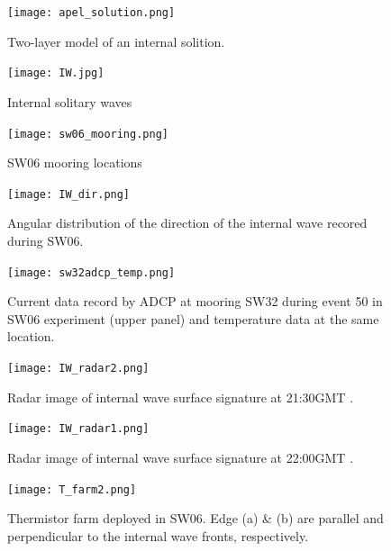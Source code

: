 
\begin{figure}[h]
\centering
  \texttt{[image: apel\_solution.png]}\\
  \caption{Two-layer model of an internal solition.}
  \label{fig:moorings}
\end{figure}



\begin{figure}[h]
\centering
  \texttt{[image: IW.jpg]}\\
  \caption{Internal solitary waves}
  \label{fig:moorings}
\end{figure}




\begin{figure}[h]
\centering
  \texttt{[image: sw06\_mooring.png]}\\
  \caption{SW06 mooring locations}
  \label{fig:moorings}
 \end{figure}


\begin{figure}[h]
\centering
  \texttt{[image: IW\_dir.png]}\\
  \caption{Angular distribution of the direction of the internal wave recored during SW06. }
  \label{fig:IW_dir}
\end{figure}


\begin{figure}[h]
\centering
  \texttt{[image: sw32adcp\_temp.png]}\\
  \caption{Current data record by ADCP at mooring SW32 during event 50 in SW06 experiment (upper panel) and  temperature data at the same location. }
  \label{fig: sw32adcp_temp}
\end{figure}


\begin{figure}[h]
\centering
  \texttt{[image: IW\_radar2.png]}\\
  \caption{Radar image of internal wave surface signature at 21:30GMT . }
  \label{fig:IW_radar2}
\end{figure}

\begin{figure}[h]
\centering
  \texttt{[image: IW\_radar1.png]}\\
  \caption{Radar image of internal wave surface signature at 22:00GMT . }
  \label{fig:IW_radar1}
\end{figure}

 \begin{figure}[h]
\centering
  \texttt{[image: T\_farm2.png]}\\
  \caption{Thermistor farm deployed in SW06. Edge (a) \& (b) are parallel and perpendicular to the internal wave fronts, respectively. }
  \label{fig:tfarm}
\end{figure}

